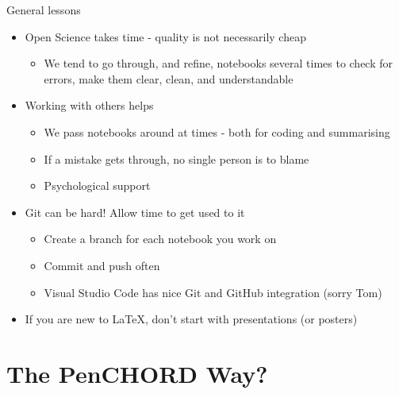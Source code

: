 \documentclass[xcolor={usenames,dvipsnames}]{beamer}
\begin{document}

\begin{frame}{General lessons}

\begin{itemize}
    \setlength\itemsep{3mm}
    \item Open Science takes time - quality is not necessarily cheap
        \begin{itemize}
            \item We tend to go through, and refine, notebooks several times to check for errors, make them clear, clean, and understandable
        \end{itemize}
    \item Working with others helps
        \begin{itemize}
            \item We pass notebooks around at times - both for coding and summarising
            \item If a mistake gets through, no single person is to blame
            \item Psychological support
        \end{itemize}
    \item Git can be hard! Allow time to get used to it
    \begin{itemize}
            \item Create a branch for each notebook you work on
            \item Commit and push often
            \item Visual Studio Code has nice Git and GitHub integration (sorry Tom)
        \end{itemize}
    \item If you are new to \LaTeX, don't start with presentations (or posters)
\end{itemize}

\end{frame}

\section{The PenCHORD Way?}
\end{document}
